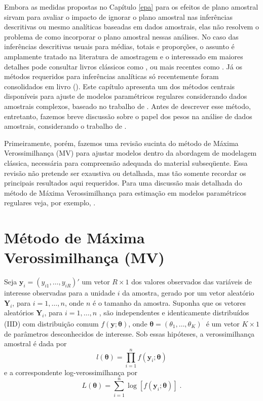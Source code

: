 \documentclass[]{book}
\theoremstyle{definition}
\theoremstyle{definition}
\theoremstyle{definition}
\theoremstyle{remark}
\begin{document}
Embora as medidas propostas no Capítulo \ref{epa} para os efeitos de
plano amostral sirvam para avaliar o impacto de ignorar o plano amostral
nas inferências descritivas ou mesmo analíticas baseadas em dados
amostrais, elas não resolvem o problema de como incorporar o plano
amostral nessas análises. No caso das inferências descritivas usuais
para médias, totais e proporções, o assunto é amplamente tratado na
literatura de amostragem e o interessado em maiores detalhes pode
consultar livros clássicos como \citep{cochran}, ou mais recentes como
\citep{SSW92}. Já os métodos requeridos para inferências analíticas só
recentemente foram consolidados em livro (\citep{SHS89}). Este capítulo
apresenta um dos métodos centrais disponíveis para ajuste de modelos
paramétricos regulares considerando dados amostrais complexos, baseado
no trabalho de \citep{binder87}. Antes de descrever esse método,
entretanto, fazemos breve discussão sobre o papel dos pesos na análise
de dados amostrais, considerando o trabalho de \citep{Pfeff}.

Primeiramente, porém, fazemos uma revisão sucinta do método de Máxima
Verossimilhança (MV) para ajustar modelos dentro da abordagem de
modelagem clássica, necessária para compreensão adequada do material
subseqüente. Essa revisão não pretende ser exaustiva ou detalhada, mas
tão somente recordar os principais resultados aqui requeridos. Para uma
discussão mais detalhada do método de Máxima Verossimilhança para
estimação em modelos paramétricos regulares veja, por exemplo,
\citep{garthwaite}.

\section{Método de Máxima Verossimilhança
(MV)}\label{metodo-de-maxima-verossimilhanca-mv}

Seja \(\mathbf{y}_{i}=\left(y_{i1},\ldots,y_{iR}\right)'\) um vetor
\(R\times 1\) dos valores observados das variáveis de interesse
observadas para a unidade \(i\) da amostra, gerado por um vetor
aleatório \(\mathbf{Y}_{i}\), para \(i=1,\ldots ,n\), onde \(n\) é o
tamanho da amostra. Suponha que os vetores aleatórios
\(\mathbf{Y}_{i}\), para \(i=1,\ldots ,n\) , são independentes e
identicamente distribuídos (IID) com distribuição comum
\(f(\mathbf{y};\mathbf{\theta })\), onde
\(\mathbf{\theta}=\left( \theta _{1},\ldots ,\theta _{K}\right) ^{^{\prime }}\)
é um vetor \(K\times 1\) de parâmetros desconhecidos de interesse. Sob
essas hipóteses, a verossimilhança amostral é dada por \[
l\left( \mathbf{\theta }\right) =\prod\limits_{i=1}^{n}f\left( \mathbf{y}
_{i};\mathbf{\theta }\right) 
\] e a correspondente log-verossimilhança por \[
L\left( \mathbf{\theta }\right) =\sum_{i=1}^n\log \left[
f\left( \mathbf{y}_{i};\mathbf{\theta }\right) \right] \;. 
\]
\end{document}
